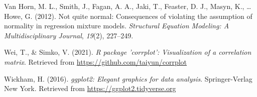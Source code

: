 \documentclass[
  man,floatsintext]{apa6}
\newlength{\cslhangindent}
\newlength{\cslentryspacingunit} %
\newenvironment{CSLReferences}[2] %
 {%
  \setlength{\parindent}{0pt}
  \ifodd #1
  \let\oldpar\par
  \def\par{\hangindent=\cslhangindent\oldpar}
  \fi
  \setlength{\parskip}{#2\cslentryspacingunit}
 }%
 {}
\begin{document}
\begin{CSLReferences}{1}{0}
\leavevmode{}%
Van Horn, M. L., Smith, J., Fagan, A. A., Jaki, T., Feaster, D. J., Masyn, K., \ldots{} Howe, G. (2012). Not quite normal: Consequences of violating the assumption of normality in regression mixture models. \emph{Structural Equation Modeling: A Multidisciplinary Journal}, \emph{19}(2), 227--249.

\leavevmode{}%
Wei, T., \& Simko, V. (2021). \emph{R package 'corrplot': Visualization of a correlation matrix}. Retrieved from \url{https://github.com/taiyun/corrplot}

\leavevmode{}%
Wickham, H. (2016). \emph{ggplot2: Elegant graphics for data analysis}. Springer-Verlag New York. Retrieved from \url{https://ggplot2.tidyverse.org}

\end{CSLReferences}
\end{document}
